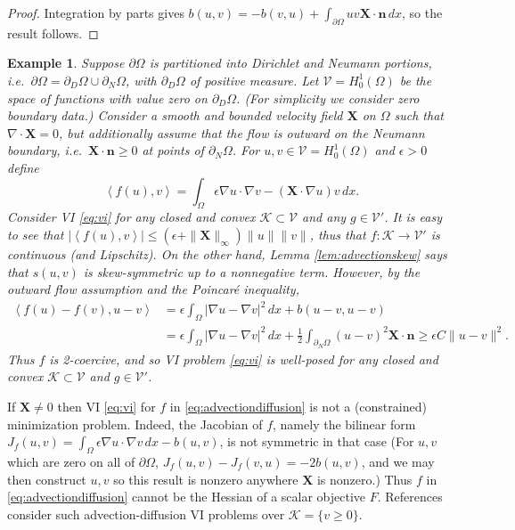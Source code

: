 \documentclass[letterpaper,final,12pt,reqno]{amsart}
\theoremstyle{cstyle}
\theoremstyle{cstyle*}
\theoremstyle{dstyle}
\newtheorem{example}[theorem]{Example}
\numberwithin{equation}{section}
\numberwithin{figure}{section}
\numberwithin{table}{section}
\numberwithin{theorem}{section}
\newcommand{\eps}{\epsilon}
\newcommand{\grad}{\nabla}
\newcommand{\Div}{\nabla\cdot}
\newcommand{\bn}{\mathbf{n}}
\newcommand{\bX}{\mathbf{X}}
\newcommand{\cK}{\mathcal{K}}
\newcommand{\cV}{\mathcal{V}}
\newcommand{\ip}[2]{\left<#1,#2\right>}
\begin{document}
\begin{proof}
Integration by parts gives $b(u,v) = - b(v,u) + \int_{\partial \Omega} uv \bX\cdot \bn\,dx$, so the result follows.
\end{proof}

\begin{example}  \label{ex:advectiondiffusion}  Suppose $\partial\Omega$ is partitioned into Dirichlet and Neumann portions, i.e.~$\partial\Omega = \partial_D\Omega \cup \partial_N\Omega$, with $\partial_D\Omega$ of positive measure.  Let $\cV = H_0^1(\Omega)$ be the space of functions with value zero on $\partial_D\Omega$.  (For simplicity we consider zero boundary data.)  Consider a smooth and bounded velocity field $\bX$ on $\Omega$ such that $\Div \bX=0$, but additionally assume that the flow is outward on the Neumann boundary, i.e.~$\bX \cdot \bn \ge 0$ at points of $\partial_N\Omega$.  For $u,v \in \cV = H_0^1(\Omega)$ and $\eps>0$ define
\begin{equation}
\ip{f(u)}{v} = \int_\Omega \eps \grad u \cdot \grad v - (\bX \cdot \grad u) v\,dx. \label{eq:advectiondiffusion}
\end{equation}
Consider VI \eqref{eq:vi} for any closed and convex $\cK \subset \cV$ and any $g\in\cV'$.  It is easy to see that $|\ip{f(u)}{v}| \le (\eps + \|\bX\|_\infty) \|u\| \|v\|$, thus that $f:\cK \to \cV'$ is continuous (and Lipschitz).  On the other hand, Lemma \ref{lem:advectionskew} says that $s(u,v)$ is skew-symmetric up to a nonnegative term.  However, by the outward flow assumption and the Poincar\'e inequality,
\begin{align*}
\ip{f(u)-f(v)}{u-v} &= \eps \int_\Omega |\grad u - \grad v|^2\,dx + b(u-v,u-v) \\
                    &= \eps \int_\Omega |\grad u - \grad v|^2\,dx + \frac{1}{2} \int_{\partial_N\Omega} (u-v)^2 \bX\cdot\bn \ge \eps C \|u-v\|^2.
\end{align*}
Thus $f$ is 2-coercive, and so VI problem \eqref{eq:vi} is well-posed for any closed and convex $\cK \subset \cV$ and $g\in \cV'$.
\end{example}

If $\bX \ne 0$ then VI \eqref{eq:vi} for $f$ in \eqref{eq:advectiondiffusion} is not a (constrained) minimization problem.  Indeed, the Jacobian of $f$, namely the bilinear form $J_f(u,v) = \int_\Omega \eps \grad u \cdot \grad v\,dx - b(u,v)$, is not symmetric in that case  (For $u,v$ which are zero on all of $\partial \Omega$, $J_f(u,v) - J_f(v,u) = -2 b(u,v)$, and we may then construct $u,v$ so this result is nonzero anywhere $\bX$ is nonzero.)  Thus $f$ in \eqref{eq:advectiondiffusion} cannot be the Hessian of a scalar objective $F$.  References \cite{Bueler2021conservation,ChangNakshatrala2017} consider such advection-diffusion VI problems over $\cK = \{v\ge 0\}$.
\end{document}
